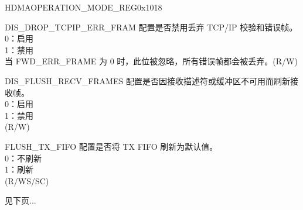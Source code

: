 \begin{register}{H}{DMAOPERATION\_MODE\_REG}{0x1018}\label{regdesc:DMAOPERATIONMODEREG}
%
%
%
%
%
%
%
%
%
%
%
%
%
%
%
%
%
%
%
\regnewline%
\begin{regdesc}\begin{reglist}
\item [DIS\_DROP\_TCPIP\_ERR\_FRAM] 配置是否禁用丢弃 TCP/IP 校验和错误帧。\\
0：启用\\
1：禁用\\
当 FWD\_ERR\_FRAME 为 0 时，此位被忽略，所有错误帧都会被丢弃。(R/W)
\item [DIS\_FLUSH\_RECV\_FRAMES] 配置是否因接收描述符或缓冲区不可用而刷新接收帧。\\
0：启用\\
1：禁用\\(R/W)
\item [FLUSH\_TX\_FIFO] 配置是否将 TX FIFO 刷新为默认值。\\
0：不刷新\\
1：刷新\\  (R/WS/SC)

\item[见下页...]
\end{reglist}\end{regdesc}
\end{register}
\addtocounter{Regfloat}{-1}

